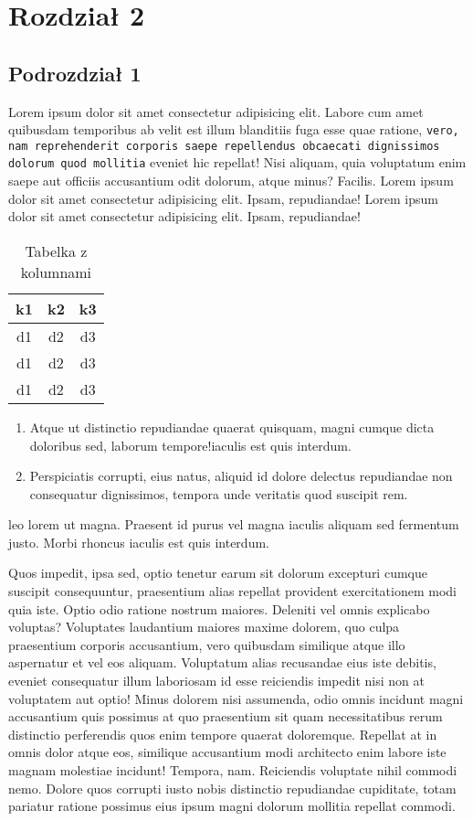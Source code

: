 \documentclass[12pt,a4paper]{article}
\begin{document}
\section{Rozdział 2}
\subsection{Podrozdział 1}
	Lorem ipsum dolor sit amet consectetur adipisicing elit. Labore cum amet quibusdam temporibus ab velit est illum blanditiis fuga esse quae ratione, \texttt{vero, nam reprehenderit corporis saepe repellendus obcaecati dignissimos dolorum quod mollitia} eveniet hic repellat! Nisi aliquam, quia voluptatum enim saepe aut officiis accusantium odit dolorum, atque minus? Facilis.  Lorem ipsum dolor sit amet consectetur adipisicing elit. Ipsam, repudiandae!  Lorem ipsum dolor sit amet consectetur adipisicing elit. Ipsam, repudiandae!
	\begin{table}[H]
		\centering
		\begin{tabular}{|c c c|} 
			\hline
			k1 & k2 & k3 \\
			\hline\hline
			d1 & d2 & d3  \\ 
			\hline
			d1 & d2 & d3  \\
			\hline
			d1 & d2 & d3 \\ 
			\hline
		\end{tabular}
  \label{tabela}
	\caption{Tabelka z kolumnami}
	\end{table}
\begin{enumerate}
\item Atque ut distinctio repudiandae quaerat quisquam, magni cumque dicta doloribus sed, laborum tempore!iaculis est quis interdum.
\item Perspiciatis corrupti, eius natus, aliquid id dolore delectus repudiandae non consequatur dignissimos, tempora unde veritatis quod suscipit rem.
\end{enumerate}
 leo lorem ut magna. Praesent id purus vel magna iaculis aliquam sed fermentum justo. Morbi rhoncus iaculis est quis interdum.

 Quos impedit, ipsa sed, optio tenetur earum sit dolorum excepturi cumque suscipit consequuntur, praesentium alias repellat provident exercitationem modi quia iste. Optio odio ratione nostrum maiores. Deleniti vel omnis explicabo voluptas? Voluptates laudantium maiores maxime dolorem, quo culpa praesentium corporis accusantium, vero quibusdam similique atque illo aspernatur et vel eos aliquam. Voluptatum alias recusandae eius iste debitis, eveniet consequatur illum laboriosam id esse reiciendis impedit nisi non at voluptatem aut optio! Minus dolorem nisi assumenda, odio omnis incidunt magni accusantium quis possimus at quo praesentium sit quam necessitatibus rerum distinctio perferendis quos enim tempore quaerat doloremque. Repellat at in omnis dolor atque eos, similique accusantium modi architecto enim labore iste magnam molestiae incidunt! Tempora, nam. Reiciendis voluptate nihil commodi nemo. Dolore quos corrupti iusto nobis distinctio repudiandae cupiditate, totam pariatur ratione possimus eius ipsum magni dolorum mollitia repellat commodi.
\end{document}
